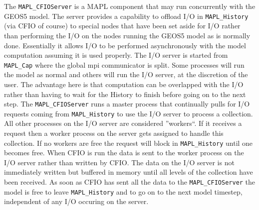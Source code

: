 The {\tt MAPL\_CFIOServer} is a MAPL component that may run concurrently with the GEOS5 model.
The server provides a capability to offload I/O in {\tt MAPL\_History} (via CFIO of course) to special nodes that have been set aside for I/O rather than
performing the I/O on the nodes running the GEOS5 model as is normally done.
Essentially it allows I/O to be performed asynchronously with the model computation assuming it is used properly.
The I/O server is started
from {\tt MAPL\_Cap} where the global mpi communicator is split. Some processes will run the model as normal and others will run the I/O server, at the discretion of the user.
The advantage here is that computation can be
overlapped with the I/O rather than having to wait for the History to finish before going on to the next step.
The {\tt MAPL\_CFIOServer} runs a master process that continually pulls for I/O
requests coming from {\tt MAPL\_History} to use the I/O server to process a collection.
All other processes on the I/O server are considered ''workers``.
If it receives a request then a worker process on the server gets assigned to handle this collection.
If no workers are free the request will block in {\tt MAPL\_History} until one becomes free.
When CFIO is run the data is sent to the worker process on the I/O server rather than written by CFIO. 
The data on the I/O server is not immediately written but buffered in memory until all levels of the collection have been received. As soon as CFIO has sent all the data to the {\tt MAPL\_CFIOServer} the model is free to leave {\tt MAPL\_History} and to go on to the next model timestep, independent of any I/O occuring on the server.


